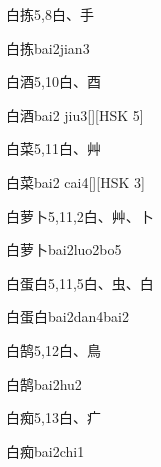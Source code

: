 \begin{entry}{白拣}{5,8}{⽩、⼿}
  \begin{phonetics}{白拣}{bai2jian3}
  \end{phonetics}
\end{entry}

\begin{entry}{白酒}{5,10}{⽩、⾣}
  \begin{phonetics}{白酒}{bai2 jiu3}[][HSK 5]
  \end{phonetics}
\end{entry}

\begin{entry}{白菜}{5,11}{⽩、⾋}
  \begin{phonetics}{白菜}{bai2 cai4}[][HSK 3]
  \end{phonetics}
\end{entry}

\begin{entry}{白萝卜}{5,11,2}{⽩、⾋、⼘}
  \begin{phonetics}{白萝卜}{bai2luo2bo5}
  \end{phonetics}
\end{entry}

\begin{entry}{白蛋白}{5,11,5}{⽩、⾍、⽩}
  \begin{phonetics}{白蛋白}{bai2dan4bai2}
  \end{phonetics}
\end{entry}

\begin{entry}{白鹄}{5,12}{⽩、⿃}
  \begin{phonetics}{白鹄}{bai2hu2}
  \end{phonetics}
\end{entry}

\begin{entry}{白痴}{5,13}{⽩、⽧}
  \begin{phonetics}{白痴}{bai2chi1}
  \end{phonetics}
\end{entry}

